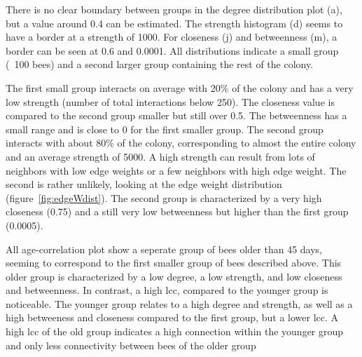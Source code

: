 There is no clear boundary between groups in the degree distribution plot (a), but a value around 0.4 can be estimated.
The strength histogram (d) seems to have a border at a strength of 1000.
For closeness (j) and betweenness (m), a border can be seen at 0.6 and 0.0001.
All distributions indicate a small group (~100 bees) and a second larger group containing the rest of the colony.

The first small group interacts on average with 20\% of the colony and has a very low strength (number of total interactions below 250). The closeness value is compared to the second group smaller but still over 0.5. The betweenness has a small range and is close to 0 for the first smaller group.
The second group interacts with about 80\% of the colony, corresponding to almost the entire colony and an average strength of 5000. A high strength can result from lots of neighbors with low edge weights or a few neighbors with high edge weight. The second is rather unlikely, looking at the edge weight distribution (figure~\ref{fig:edgeWdist}). The second group is characterized by a very high closeness (0.75) and a still very low betweenness but higher than the first group (0.0005).

All age-correlation plot show a seperate group of bees older than 45 days, seeming to correspond to the first smaller group of bees described above.
This older group is characterized by a low degree, a low strength, and low closeness and betweenness. In contrast, a high lcc, compared to the younger group is noticeable.
The younger group relates to a high degree and strength, as well as a high betweeness and closeness compared to the first group, but a lower lcc.
A high lcc of the old group indicates a high connection within the younger group and only less connectivity between bees of the older group


